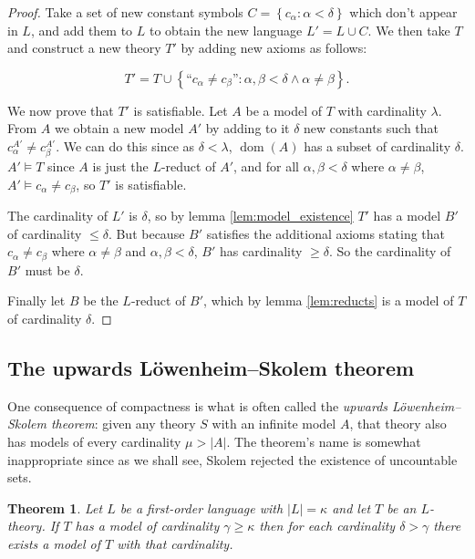 \documentclass[10pt, a4paper, oneside]{article}
\newtheorem{thm}{Theorem}[section]
\theoremstyle{definition}
\theoremstyle{remark}
\theoremstyle{plain}
\theoremstyle{plain}
\DeclareMathOperator{\dom}{dom}
\begin{document}
\begin{proof}
    Take a set of new constant symbols $C = \left\{ c_\alpha : \alpha < \delta
    \right\}$ which don't appear in $L$, and add them to $L$ to obtain the new
    language $L' = L \cup C$. We then take $T$ and construct a new theory $T'$
    by adding new axioms as follows:
    
    \begin{equation}
        T' = T \cup \left\{
            \text{``$c_\alpha \neq c_\beta$''}
            :
            \alpha, \beta < \delta \wedge \alpha \neq \beta
        \right\}.
    \end{equation}
    
    We now prove that $T'$ is satisfiable. Let $A$ be a model of $T$ with
    cardinality $\lambda$. From $A$ we obtain a new model $A'$ by adding to it
    $\delta$ new constants such that $c_\alpha^{A'} \neq c_\beta^{A'}$. We can
    do this since as $\delta < \lambda$, $\dom(A)$ has a subset of cardinality
    $\delta$. $A' \models T$ since $A$ is just the $L$-reduct of $A'$, and for
    all $\alpha, \beta < \delta$ where $\alpha \neq \beta$,
    $A' \models c_\alpha \neq c_\beta$, so $T'$ is satisfiable.
    
    The cardinality of $L'$ is $\delta$, so by lemma \ref{lem:model_existence}
    $T'$ has a model $B'$ of cardinality $\leq \delta$. But because $B'$
    satisfies the additional axioms stating that $c_\alpha \neq c_\beta$ where
    $\alpha \neq \beta$ and $\alpha, \beta < \delta$, $B'$ has cardinality
    $\geq \delta$. So the cardinality of $B'$ must be $\delta$.
    
    Finally let $B$ be the $L$-reduct of $B'$, which by lemma \ref{lem:reducts}
    is a model of $T$ of cardinality $\delta$.
\end{proof}

\subsection{The upwards Löwenheim--Skolem theorem}

One consequence of compactness is what is often called the \emph{upwards
Löwenheim--Skolem theorem}: given any theory $S$ with an infinite model $A$,
that theory also has models of every cardinality $\mu > |A|$. The theorem's
name is somewhat inappropriate since as we shall see, Skolem rejected the
existence of uncountable sets.

\begin{thm}
    Let $L$ be a first-order language with $|L| = \kappa$ and let $T$ be an
    $L$-theory. If $T$ has a model of cardinality $\gamma \geq \kappa$ then for
    each cardinality $\delta > \gamma$ there exists a model of $T$ with that
    cardinality.
\end{thm}
\end{document}
